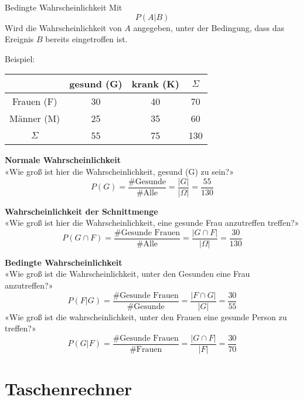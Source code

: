 \begin{multicols}{2}
\begin{definition*}{Bedingte Wahrscheinlichkeit}{}
Mit
$$P(A|B)$$
Wird die Wahrscheinlichkeit von $A$ angegeben, unter der Bedingung,
dass das Ereignis $B$ bereits eingetroffen ist.
\end{definition*}

Beispiel:

\begin{tabular}{c|c|c|c}
           & gesund (G)& krank (K)& $\Sigma$ \\\hline
Frauen (F) &        30 &       40 &       70 \\\hline
Männer (M) &        25 &       35 &       60 \\\hline
$\Sigma$   &        55 &       75 &      130 \\\hline
 \end{tabular}

\textbf{Normale Wahrscheinlichkeit}\\
«Wie groß ist hier die Wahrscheinlichkeit, gesund (G) zu sein?»
$$P(G) = \frac{\textrm{\#Gesunde}}{\textrm{\#Alle}} = \frac{|G|}{|\Omega|} = \frac{55}{130}$$

\textbf{Wahrscheinlichkeit der Schnittmenge}\\
«Wie groß ist hier die Wahrscheinlichkeit, eine gesunde Frau anzutreffen treffen?»
$$P(G\cap F) = \frac{\textrm{\#Gesunde Frauen}}{\textrm{\#Alle}}=\frac{|G\cap F|}{|\Omega|} = \frac{30}{130}$$

\textbf{Bedingte Wahrscheinlichkeit}\\
«Wie groß ist die Wahrscheinlichkeit, unter den Gesunden eine Frau anzutreffen?»
$$P(F | G) = \frac{\textrm{\#Gesunde Frauen}}{\textrm{\#Gesunde}} = \frac{|F\cap G|}{|G|} = \frac{30}{55}$$
«Wie groß ist die wahrscheinlichkeit, unter den Frauen eine gesunde Person zu treffen?»
$$P(G | F) = \frac{\textrm{\#Gesunde Frauen}}{\textrm{\#Frauen}}= \frac{|G \cap F|}{|F|} = \frac{30}{70}$$


\end{multicols}


\newpage


\section*{Taschenrechner}

